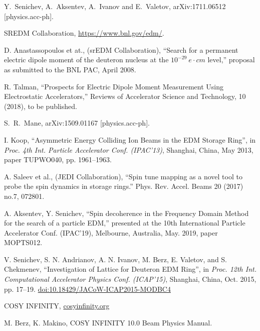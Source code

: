 \documentclass[a4paper]{jacow}
\begin{document}
\begin{thebibliography}{9}

  Y.~Senichev, A.~Aksentev, A.~Ivanov and E.~Valetov,
  arXiv:1711.06512 [physics.acc-ph].

  SREDM Collaboration, \url{https://www.bnl.gov/edm/}.

  D. Anastassopoulos et at., (srEDM Collaboration), ``Search for a permanent electric dipole moment of
  the deuteron nucleus at the $10^{-29}~e\cdot cm$ level,'' proposal as submitted to the BNL PAC, April 2008.

  R. Talman, ``Prospects for Electric Dipole Moment Measurement Using Electrostatic Accelerators,''
  Reviews of Accelerator Science and Technology, 10 (2018), to be published.

  S.~R.~Mane,
  arXiv:1509.01167 [physics.acc-ph].

   I. Koop,
   \textquotedblleft{Asymmetric Energy Colliding Ion Beams in the EDM Storage Ring}\textquotedblright,
   in \emph{Proc. 4th Int. Particle Accelerator Conf. (IPAC'13)}, Shanghai, China, May 2013, paper TUPWO040,
   pp. 1961--1963.

  A. Saleev et al., (JEDI Collaboration), ``Spin tune mapping as a novel tool to probe
  the spin dynamics in storage rings.'' Phys. Rev. Accel. Beams 20 (2017) no.7, 072801.

  A. Aksentev, Y. Senichev, ``Spin decoherence in the Frequency Domain Method for the search of a particle EDM,''
  presented at the 10th International Particle Accelerator Conf. (IPAC’19), Melbourne, Australia,
  May. 2019, paper MOPTS012.

   V. Senichev, S. N. Andrianov, A. N. Ivanov, M. Berz, E. Valetov, and S. Chekmenev,
   \textquotedblleft{Investigation of Lattice for Deuteron EDM Ring}\textquotedblright,
   in \emph{Proc. 12th Int. Computational Accelerator Physics Conf. (ICAP'15)}, Shanghai, China, Oct. 2015,
   pp. 17--19. \url{doi:10.18429/JACoW-ICAP2015-MODBC4}       

  COSY INFINITY, \url{cosyinfinity.org}

  M. Berz, K. Makino, COSY INFINITY 10.0 Beam Physics Manual.

\end{thebibliography} 
\end{document}

